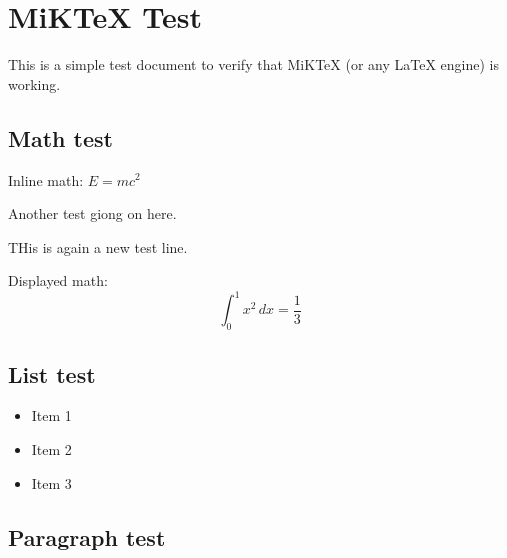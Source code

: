 \documentclass{article}
\begin{document}
\section*{MiKTeX Test}

This is a simple test document to verify that MiKTeX (or any LaTeX engine) is working.

\subsection*{Math test}
Inline math: \( E = mc^2 \)

Another test giong on here.

THis is again a new test line.



Displayed math:
\[
\int_{0}^{1} x^2\,dx = \frac{1}{3}
\]

\subsection*{List test}
\begin{itemize}
    \item Item 1
    \item Item 2
    \item Item 3
\end{itemize}

\subsection*{Paragraph test}
\lipsum[1]
\end{document}
